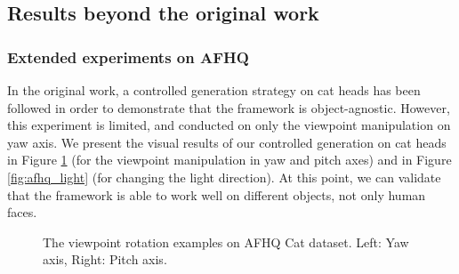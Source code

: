 \subsection{Results beyond the original work}

\subsubsection{Extended experiments on AFHQ}

In the original work, a controlled generation strategy on cat heads has been followed in order to demonstrate that the framework is object-agnostic. However, this experiment is limited, and conducted on only the viewpoint manipulation on yaw axis. We present the visual results of our controlled generation on cat heads in Figure \ref{fig:afhq_view} (for the viewpoint manipulation in yaw and pitch axes) and in Figure \ref{fig:afhq_light} (for changing the light direction). At this point, we can validate that the framework is able to work well on different objects, not only human faces.

    
\begin{figure}[h!]%
    \centering
    \qquad
    \caption{The viewpoint rotation examples on AFHQ Cat dataset. Left: Yaw axis, Right: Pitch axis.}%
    \label{fig:afhq_view}%
\end{figure}

